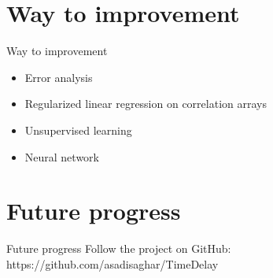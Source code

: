 \documentclass[9pt]{beamer}
\begin{document}
\section{Way to improvement}
  \begin{frame}{Way to improvement}
    \begin{itemize}
      \item Error analysis
      \item Regularized linear regression on correlation arrays
      \item Unsupervised learning
      \item Neural network
    \end{itemize}
\end{frame}

\section{Future progress}
\begin{frame}{Future progress}
  \hspace{0.33\textwidth}Follow the project on GitHub: \\
  \hspace{0.24\textwidth}https://github.com/asadisaghar/TimeDelay
\end{frame}
\end{document}
